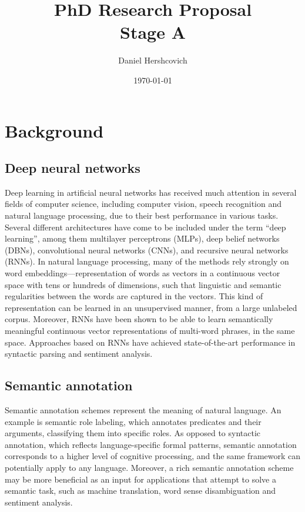 \documentclass[11pt]{article}
\begin{document}
\title{PhD Research Proposal \\ Stage A}
\author{Daniel Hershcovich}
\date{\today}
\maketitle


\section{Background}

\subsection{Deep neural networks}

Deep learning in artificial neural networks has received much attention in several fields of computer science, including computer vision, speech recognition and natural language processing, due to their best performance in various tasks. Several different architectures have come to be included under the term “deep learning”, among them multilayer perceptrons (MLPs), deep belief networks (DBNs), convolutional neural networks (CNNs), and recursive neural networks (RNNs). In natural language processing, many of the methods rely strongly on word embeddings---representation of words as vectors in a continuous vector space with tens or hundreds of dimensions, such that linguistic and semantic regularities between the words are captured in the vectors. This kind of representation can be learned in an unsupervised manner, from a large unlabeled corpus. Moreover, RNNs have been shown to be able to learn semantically meaningful continuous vector representations of multi-word phrases, in the same space. Approaches based on RNNs have achieved state-of-the-art performance in syntactic parsing and sentiment analysis.

\subsection{Semantic annotation}

Semantic annotation schemes represent the meaning of natural language. An example is semantic role labeling, which annotates predicates and their arguments, classifying them into specific roles. As opposed to syntactic annotation, which reflects language-specific formal patterns, semantic annotation corresponds to a higher level of cognitive processing, and the same framework can potentially apply to any language. Moreover, a rich semantic annotation scheme may be more beneficial as an input for applications that attempt to solve a semantic task, such as machine translation, word sense disambiguation and sentiment analysis.
\end{document}
